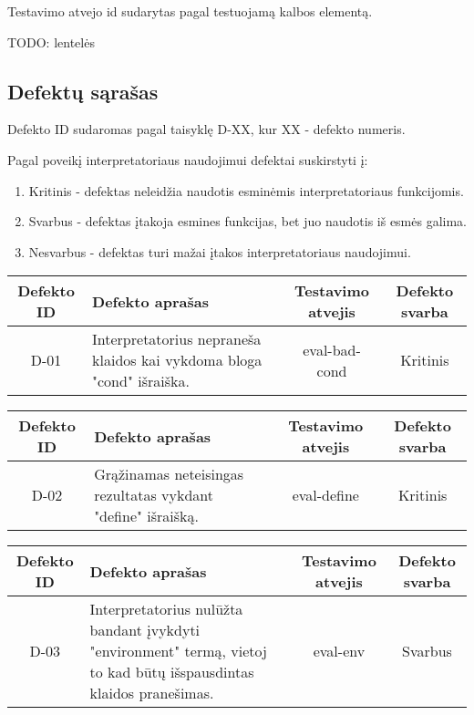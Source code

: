 \documentclass{VUMIFPSkursinis}
\begin{document}
Testavimo atvejo id sudarytas pagal testuojamą kalbos elementą.

TODO: lentelės


\subsection{Defektų sąrašas}

Defekto ID sudaromas pagal taisyklę D-XX, kur XX - defekto numeris.

Pagal poveikį interpretatoriaus naudojimui defektai suskirstyti į:

\begin{enumerate}
	\item Kritinis - defektas neleidžia naudotis esminėmis interpretatoriaus funkcijomis.
	\item Svarbus - defektas įtakoja esmines funkcijas, bet juo naudotis iš esmės galima.
  \item Nesvarbus - defektas turi mažai įtakos interpretatoriaus naudojimui.
\end{enumerate}

\begin{table}[H]\footnotesize
  \centering
  {\begin{tabular}{|c|l|c|c|} \hline
    Defekto ID & Defekto aprašas & Testavimo atvejis & Defekto svarba  \\
    \hline
    D-01 & Interpretatorius nepraneša klaidos kai vykdoma bloga "cond" išraiška. & eval-bad-cond & Kritinis \\
    \hline
  \end{tabular}}
  \label{tab:table example}
\end{table}

\begin{table}[H]\footnotesize
  \centering
  {\begin{tabular}{|c|l|c|c|} \hline
    Defekto ID & Defekto aprašas & Testavimo atvejis & Defekto svarba  \\
    \hline
    D-02 & Grąžinamas neteisingas rezultatas vykdant "define" išraišką. & eval-define & Kritinis \\
    \hline
  \end{tabular}}
  \label{tab:table example}
\end{table}

\begin{table}[H]\footnotesize
  \centering
  {\begin{tabular}{|c|l|c|c|} \hline
    Defekto ID & Defekto aprašas & Testavimo atvejis & Defekto svarba  \\
    \hline
    D-03 & Interpretatorius nulūžta bandant įvykdyti "environment" termą, vietoj to kad būtų išspausdintas klaidos pranešimas. & eval-env & Svarbus \\
    \hline
  \end{tabular}}
  \label{tab:table example}
\end{table}
\end{document}

